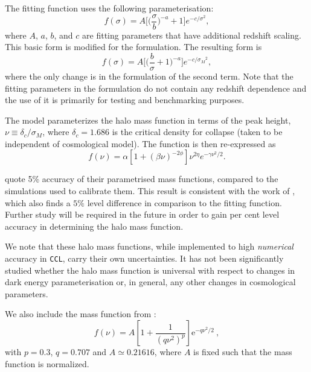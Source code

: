 \documentclass[\docopts]{\docclass}
\newcommand{\ccl}{{\tt CCL}\xspace}
\begin{document}
The \citet{Tinker2008} fitting function uses the following parameterisation:
\begin{equation}
f(\sigma)=A\Big[\Big(\frac{\sigma}{b}\Big)^{-a}+1\Big]e^{-c/{\sigma}^2},
\end{equation}
where $A$, $a$, $b$, and $c$ are fitting parameters that have additional redshift scaling. This basic form is modified for the \citet{Angulo2012} formulation. The resulting form is
\begin{equation}
f(\sigma)=A\Big[\Big(\frac{b}{\sigma}+1\Big)^{-a}\Big]e^{-c/{\sigma_M}^2},
\end{equation}
where the only change is in the formulation of the second term. Note that the fitting parameters in the \citet{Angulo2012} formulation do not contain any redshift dependence and the use of it is primarily for testing and benchmarking purposes.

The \citet{Tinker2010} model parameterizes the halo mass function in terms of the peak height, $\nu \equiv \delta_c/\sigma_M$, where $\delta_c=1.686$ is the critical density for collapse (taken to be independent of cosmological model). The function is then re-expressed as
\begin{equation}
  f(\nu) = \alpha[1+(\beta\nu)^{-2\phi}]\nu^{2\eta}e^{-\gamma\nu^2/2}.
  \label{eq:tinkerf}
\end{equation}

\citet{Tinker2008,Tinker2010} quote 5\% accuracy of their parametrised mass functions, compared to the simulations used to calibrate them. This result is consistent with the work of \citet{Watson2013}, which also finds a $5\%$ level difference in comparison to the \citet{Tinker2008} fitting function. Further study will be required in the future in order to gain per cent level accuracy in determining the halo mass function.

We note that these halo mass functions, while implemented to high {\em numerical} accuracy in \ccl, carry their own uncertainties. It has not been significantly studied whether the halo mass function is universal with respect to changes in dark energy parameterisation or, in general, any other changes in cosmological parameters.

We also include the mass function from \cite{Sheth1999}:
\begin{equation}
f(\nu)=A\left[1+\frac{1}{(q\nu^2)^p}\right]\mathrm{e}^{-q\nu^2/2}\ ,
\label{eq:st_mf}
\end{equation}
with $p=0.3$, $q=0.707$ and $A\simeq 0.21616$, where $A$ is fixed such that the mass function is normalized.
\end{document}
